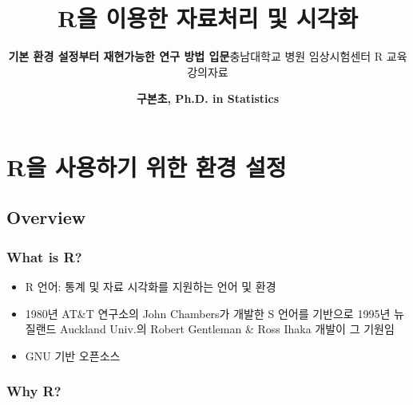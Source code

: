 \documentclass[11pt,a4paper]{book}
\title{\textbf{\LARGE R을 이용한 자료처리 및 시각화}}
\subtitle{\textbf{\Large 기본 환경 설정부터 재현가능한 연구 방법 입문}\vspace{2cm}\linebreak 충남대학교
병원 임상시험센터 R 교육 강의자료}
\author{\textbf{\Large 구본초, Ph.D. in Statistics}}
\date{}
\theoremstyle{definition}
\theoremstyle{definition}
\theoremstyle{definition}
\theoremstyle{remark}
\begin{document}
\maketitle

{
\hypersetup{linkcolor=black}
\setcounter{tocdepth}{2}
\tableofcontents
}
\chapter{R을 사용하기 위한 환경 설정}\label{r----}

\section{Overview}\label{overview}

\subsection{What is R?}\label{what-is-r}

\begin{itemize}
\item
  R 언어: 통계 및 자료 시각화를 지원하는 언어 및 환경
\item
  1980년 AT\&T 연구소의 John Chambers가 개발한 S 언어를 기반으로 1995년
  뉴질랜드 Auckland Univ.의 Robert Gentleman \& Ross Ihaka 개발이 그
  기원임
\item
  GNU 기반 오픈소스
\end{itemize}

\subsection{Why R?}\label{why-r}
\end{document}
